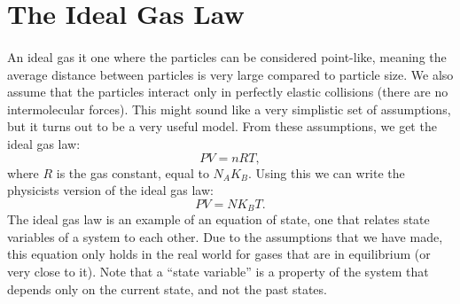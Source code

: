 \documentclass[../thermodynamics.tex]{subfiles}
\begin{document}
    \section{The Ideal Gas Law}
        \paragraph{}
        An ideal gas it one where the particles can be considered point-like, meaning the average distance between particles is very large compared to particle size.
        We also assume that the particles interact only in perfectly elastic collisions (there are no intermolecular forces).
        This might sound like a very simplistic set of assumptions, but it turns out to be a very useful model.
        From these assumptions, we get the ideal gas law:
        \begin{equation}
            PV=nRT,
        \end{equation}
        where $R$ is the gas constant, equal to $N_AK_B$. Using this we can write the physicists version of the ideal gas law:
        \begin{equation}
            PV=NK_BT.
        \end{equation}
        The ideal gas law is an example of an equation of state, one that relates state variables of a system to each other.
        Due to the assumptions that we have made, this equation only holds in the real world for gases that are in equilibrium (or very close to it).
        Note that a ``state variable'' is a property of the system that depends only on the current state, and not the past states.
\end{document}
